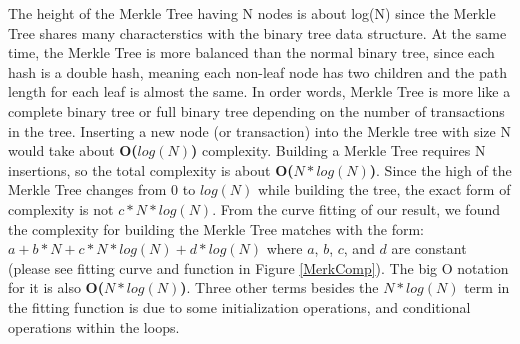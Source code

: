 \documentclass[pdftex,11pt]{article}
\begin{document}
The height of the Merkle Tree having N nodes is about log(N) since the Merkle Tree shares many characterstics with the binary tree data structure. At the same time, the Merkle Tree is more balanced than the normal binary tree, since each hash is a double hash, meaning each non-leaf node has two children and the path length for each leaf is almost the same. In order words, Merkle Tree is more like a complete binary tree or full binary tree depending on the number of transactions in the tree. Inserting a new node (or transaction) into the Merkle tree with size N would take about {\bf O($log(N)$)} complexity. Building a Merkle Tree requires N insertions, so the total complexity is about {\bf O($N*log(N)$)}. Since the high of the Merkle Tree changes from 0 to $log(N)$ while building the tree, the exact form of complexity is not $c*N*log(N)$. From the curve fitting of our result, we found the complexity for building the Merkle Tree matches with the form: $a+b*N+c*N*log(N)+d*log(N)$ where $a$, $b$, $c$, and $d$ are constant (please see fitting curve and function in Figure \ref{MerkComp}). The big O notation for it is also {\bf O($N*log(N)$)}. Three other terms besides the $N*log(N)$ term in the fitting function is due to some initialization operations, and conditional operations within the loops.
\end{document}
